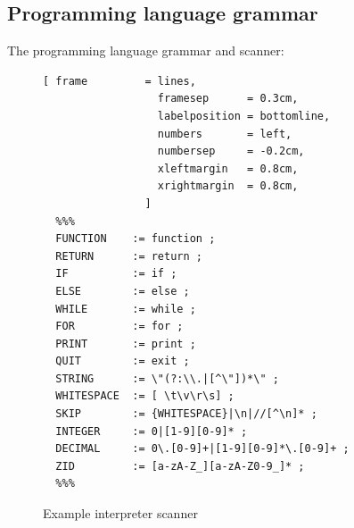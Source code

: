 \subsection{Programming language grammar}
The programming language grammar and scanner:
%
\begin{figure}[!ht]

\begin{Verbatim}[ frame         = lines, 
                  framesep      = 0.3cm, 
                  labelposition = bottomline,
                  numbers       = left,
                  numbersep     = -0.2cm,
                  xleftmargin   = 0.8cm,
                  xrightmargin  = 0.8cm,
                ]
  %%%
  FUNCTION    := function ;
  RETURN      := return ;
  IF          := if ;
  ELSE        := else ;
  WHILE       := while ;
  FOR         := for ;
  PRINT       := print ;
  QUIT        := exit ;
  STRING      := \"(?:\\.|[^\"])*\" ;
  WHITESPACE  := [ \t\v\r\s] ;
  SKIP        := {WHITESPACE}|\n|//[^\n]* ;
  INTEGER     := 0|[1-9][0-9]* ;
  DECIMAL     := 0\.[0-9]+|[1-9][0-9]*\.[0-9]+ ;
  ZID         := [a-zA-Z_][a-zA-Z0-9_]* ;  
  %%%
\end{Verbatim}
\caption{Example interpreter scanner}
\label{fig:example_interpreter_grammar_scanner}
\end{figure}

